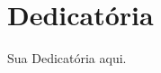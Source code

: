 \clearpage
\onehalfspacing
{}
\setcounter{page}{2}
\pagestyle{fancy}
\fancyhead{}
\fancyhead[RO,LE]{\thepage}
\fancyfoot{}
\fancyfoot[LE,RO]{}
\fancyfoot[LO,CE]{}
\fancyfoot[CO,RE]{}
\vspace*{0.7cm}
\section*{\hfill Dedicatória}
\vspace*{\fill}
\begin{flushright}
Sua Dedicatória aqui.
\end{flushright}
